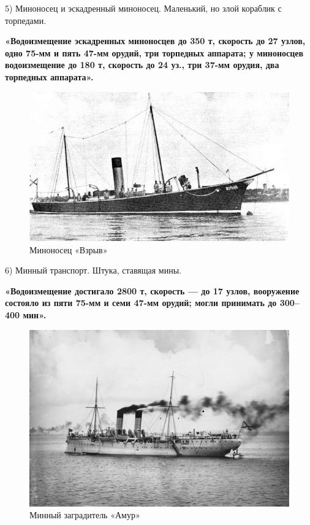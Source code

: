 5) Миноносец и эскадренный миноносец. Маленький, но злой кораблик с торпедами.

\textbf{«Водоизмещение эскадренных миноносцев до 350 т, скорость до 27 узлов, одно 75-мм и пять 47-мм орудий, три торпедных аппарата; у миноносцев водоизмещение до 180 т, скорость до 24 уз., три 37-мм орудия, два торпедных аппарата».}

\begin{figure}[h!tb] 
	\centering\includegraphics[scale=0.4]{Data/RYAV_sily_storon/a1QM7sSGutc.jpg}
	\caption{Миноносец «Взрыв»
	}
\end{figure}

6) Минный транспорт. Штука, ставящая мины.

\textbf{«Водоизмещение достигало 2800 т, скорость — до 17 узлов, вооружение состояло из пяти 75-мм и семи 47-мм орудий; могли принимать до 300–400 мин».}

\begin{figure}[h!tb] 
	\centering\includegraphics[scale=0.3]{Data/RYAV_sily_storon/w5qmReYSZTc.jpg}
	\caption{Минный заградитель «Амур»
	}
\end{figure}

